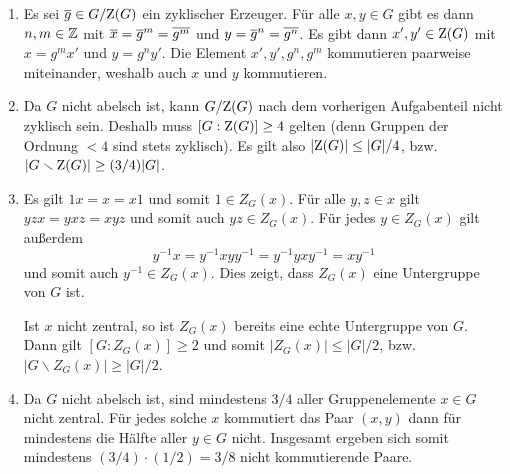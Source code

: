 \begin{solution}
  \begin{enumerate}
    \item
      Es sei $\overline{g} \in G/{\operatorname{Z}(G)}$ ein zyklischer Erzeuger.
      Für alle $x, y \in G$ gibt es dann $n, m \in \mathbb{Z}$ mit $\overline{x} = \overline{g}^m = \overline{g^m}$ und $y = \overline{g}^n = \overline{g^n}$.
      Es gibt dann $x', y' \in \operatorname{Z}(G)$ mit $x = g^m x'$ und $y = g^n y'$.
      Die Element $x', y', g^n, g^m$ kommutieren paarweise miteinander, weshalb auch $x$ und $y$ kommutieren.
    \item
      Da $G$ nicht abelsch ist, kann $G/{\operatorname{Z}(G)}$ nach dem vorherigen Aufgabenteil nicht zyklisch sein.
      Deshalb muss $[G : \operatorname{Z}(G)] \geq 4$ gelten (denn Gruppen der Ordnung $< 4$ sind stets zyklisch).
      Es gilt also $|{\operatorname{Z}(G)}| \leq |G|/4$, bzw.\ $|G \smallsetminus \operatorname{Z}(G)| \geq (3/4)|G|$.
    \item
      Es gilt $1 x = x = x 1$ und somit $1 \in Z_G(x)$.
      Für alle $y, z \in x$ gilt $yzx = yxz = xyz$ und somit auch $yz \in Z_G(x)$.
      Für jedes $y \in Z_G(x)$ gilt außerdem
      \[
          y^{-1} x
        = y^{-1} x y y^{-1}
        = y^{-1} y x y^{-1}
        = x y^{-1}
      \]
      und somit auch $y^{-1} \in Z_G(x)$.
      Dies zeigt, dass $Z_G(x)$ eine Untergruppe von $G$ ist.
      
      Ist $x$ nicht zentral, so ist $Z_G(x)$ bereits eine echte Untergruppe von $G$.
      Dann gilt $[G : Z_G(x)] \geq 2$ und somit $|Z_G(x)| \leq |G|/2$, bzw.\ $|G \smallsetminus Z_G(x)| \geq |G|/2$.
    \item
      Da $G$ nicht abelsch ist, sind mindestens $3/4$ aller Gruppenelemente $x \in G$ nicht zentral.
      Für jedes solche $x$ kommutiert das Paar $(x,y)$ dann für mindestens die Hälfte aller $y \in G$ nicht.
      Insgesamt ergeben sich somit mindestens $(3/4) \cdot (1/2) = 3/8$ nicht kommutierende Paare.
  \end{enumerate}
\end{solution}


